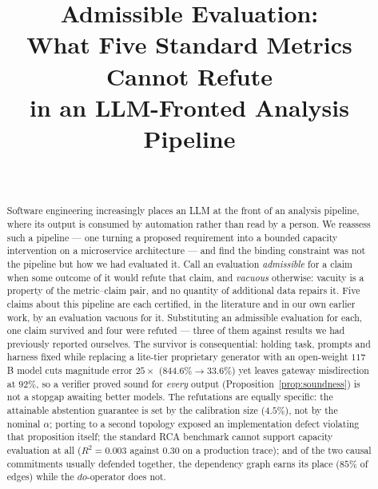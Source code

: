 \documentclass[journal, 10pt]{IEEEtran}
\begin{document}
\title{Admissible Evaluation:\\
What Five Standard Metrics Cannot Refute\\
in an LLM-Fronted Analysis Pipeline}

\author{
     \\
}

\maketitle

\begin{abstract}
Software engineering increasingly places an LLM at the front of an analysis
pipeline, where its output is consumed by automation rather than read by a
person. We reassess such a pipeline --- one turning a proposed requirement into a
bounded capacity intervention on a microservice architecture --- and find the
binding constraint was not the pipeline but how we had evaluated it. Call an
evaluation \emph{admissible} for a claim when some outcome of it would refute
that claim, and \emph{vacuous} otherwise: vacuity is a property of the
metric--claim pair, and no quantity of additional data repairs it. Five claims
about this pipeline are each certified, in the literature and in our own earlier
work, by an evaluation vacuous for it. Substituting an admissible evaluation for each, one claim survived and four
were refuted --- three of them against results we had previously reported
ourselves. The survivor is consequential: holding task, prompts and harness fixed
while replacing a lite-tier proprietary generator with an open-weight $117$B
model cuts magnitude error $25{\times}$ ($844.6\%\!\to\!33.6\%$) yet leaves
gateway misdirection at $92\%$, so a verifier proved sound for \emph{every}
output (Proposition~\ref{prop:soundness}) is not a stopgap awaiting better
models. The refutations are equally specific: the attainable abstention guarantee
is set by the calibration size ($4.5\%$), not by the nominal $\alpha$; porting to
a second topology exposed an implementation defect violating that proposition
itself; the standard RCA benchmark cannot support capacity evaluation at all
($R^2 = 0.003$ against $0.30$ on a production trace); and of the two causal
commitments usually defended together, the dependency graph earns its place
($85\%$ of edges) while the $do$-operator does not.
\end{abstract}
\end{document}
